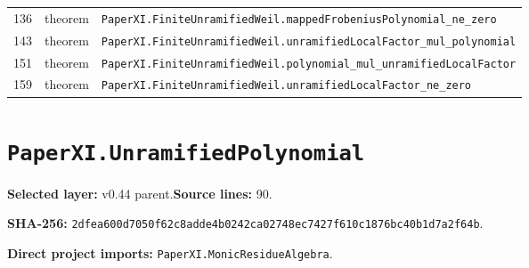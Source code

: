 \documentclass[10pt,oneside]{book}
\begin{document}
\begin{longtable}{@{}p{}p{}p{}@{}}
136&theorem&\nolinkurl{PaperXI.FiniteUnramifiedWeil.mappedFrobeniusPolynomial_ne_zero}\\

143&theorem&\nolinkurl{PaperXI.FiniteUnramifiedWeil.unramifiedLocalFactor_mul_polynomial}\\

151&theorem&\nolinkurl{PaperXI.FiniteUnramifiedWeil.polynomial_mul_unramifiedLocalFactor}\\

159&theorem&\nolinkurl{PaperXI.FiniteUnramifiedWeil.unramifiedLocalFactor_ne_zero}\\

\bottomrule\end{longtable}

\section{\texorpdfstring{\nolinkurl{PaperXI.UnramifiedPolynomial}}{PaperXI.UnramifiedPolynomial}}\label{module:PaperXI.UnramifiedPolynomial}

\textbf{Selected layer:} v0.44 parent.\quad\textbf{Source lines:} 90.\par\textbf{SHA-256:} {\scriptsize\nolinkurl{2dfea600d7050f62c8adde4b0242ca02748ec7427f610c1876bc40b1d7a2f64b}}.


\textbf{Direct project imports:} \nolinkurl{PaperXI.MonicResidueAlgebra}.
\end{document}
